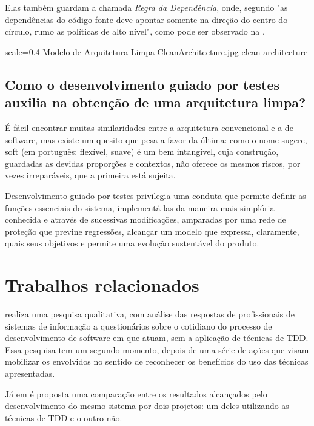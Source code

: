   Elas também guardam a chamada \emph{Regra da Dependência}, onde, segundo  "as dependências do código fonte deve apontar somente na direção do centro do círculo, rumo as políticas de alto nível", como pode ser observado na .

  \imagem
    {scale=0.4}
    {Modelo de Arquitetura Limpa}
    {CleanArchitecture.jpg}
    {clean-architecture}
    {\cite[pág. 197]{Martin2018}}

  \subsection{Como o desenvolvimento guiado por testes auxilia na obtenção de uma arquitetura limpa?}

    É fácil encontrar muitas similaridades entre a arquitetura convencional e a de software, mas existe um quesito que pesa a favor da última: como o nome sugere, soft (em português: flexível, suave) é um bem intangível, cuja construção, guardadas as devidas proporções e contextos, não oferece os mesmos riscos, por vezes irreparáveis, que a primeira está sujeita.

    Desenvolvimento guiado por testes privilegia uma conduta que permite definir as funções essenciais do sistema, implementá-las da maneira mais simplória conhecida e através de sucessivas modificações, amparadas por uma rede de proteção que previne regressões, alcançar um modelo que expressa, claramente, quais seus objetivos e permite uma evolução sustentável do produto.

\section{Trabalhos relacionados}

   realiza uma pesquisa qualitativa, com análise das respostas de profissionais de sistemas de informação a questionários sobre o cotidiano do processo de desenvolvimento de software em que atuam, sem a aplicação de técnicas de TDD. Essa pesquisa tem um segundo momento, depois de uma série de ações que visam mobilizar os envolvidos no sentido de reconhecer os benefícios do uso das técnicas apresentadas.

  Já em  é proposta uma comparação entre os resultados alcançados pelo desenvolvimento do mesmo sistema por dois projetos: um deles utilizando as técnicas de TDD e o outro não.

